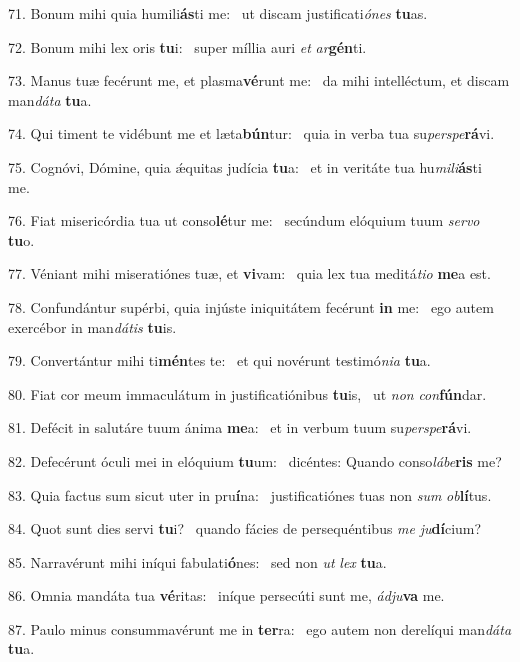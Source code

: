71. Bonum mihi quia humili\textbf{ás}ti me: \ast\  ut discam justificati\textit{ó}\textit{nes} \textbf{tu}as.\

72. Bonum mihi lex oris \textbf{tu}i: \ast\  super míllia auri \textit{et} \textit{ar}\textbf{gén}ti.\

73. Manus tuæ fecérunt me, et plasma\textbf{vé}runt me: \ast\  da mihi intelléctum, et discam man\textit{dá}\textit{ta} \textbf{tu}a.\

74. Qui timent te vidébunt me et læta\textbf{bún}tur: \ast\  quia in verba tua su\textit{per}\textit{spe}\textbf{rá}vi.\

75. Cognóvi, Dómine, quia ǽquitas judícia \textbf{tu}a: \ast\  et in veritáte tua hu\textit{mi}\textit{li}\textbf{ás}ti me.\

76. Fiat misericórdia tua ut conso\textbf{lé}tur me: \ast\  secúndum elóquium tuum \textit{ser}\textit{vo} \textbf{tu}o.\

77. Véniant mihi miseratiónes tuæ, et \textbf{vi}vam: \ast\  quia lex tua meditá\textit{ti}\textit{o} \textbf{me}a est.\

78. Confundántur supérbi, quia injúste iniquitátem fecérunt \textbf{in} me: \ast\  ego autem exercébor in man\textit{dá}\textit{tis} \textbf{tu}is.\

79. Convertántur mihi ti\textbf{mén}tes te: \ast\  et qui novérunt testimó\textit{ni}\textit{a} \textbf{tu}a.\

80. Fiat cor meum immaculátum in justificatiónibus \textbf{tu}is, \ast\  ut \textit{non} \textit{con}\textbf{fún}dar.\

81. Defécit in salutáre tuum ánima \textbf{me}a: \ast\  et in verbum tuum su\textit{per}\textit{spe}\textbf{rá}vi.\

82. Defecérunt óculi mei in elóquium \textbf{tu}um: \ast\  dicéntes: Quando conso\textit{lá}\textit{be}\textbf{ris} me?\

83. Quia factus sum sicut uter in pru\textbf{í}na: \ast\  justificatiónes tuas non \textit{sum} \textit{ob}\textbf{lí}tus.\

84. Quot sunt dies servi \textbf{tu}i? \ast\  quando fácies de persequéntibus \textit{me} \textit{ju}\textbf{dí}cium?\

85. Narravérunt mihi iníqui fabulati\textbf{ó}nes: \ast\  sed non \textit{ut} \textit{lex} \textbf{tu}a.\

86. Omnia mandáta tua \textbf{vé}ritas: \ast\  iníque persecúti sunt me, \textit{ád}\textit{ju}\textbf{va} me.\

87. Paulo minus consummavérunt me in \textbf{ter}ra: \ast\  ego autem non derelíqui man\textit{dá}\textit{ta} \textbf{tu}a.\

